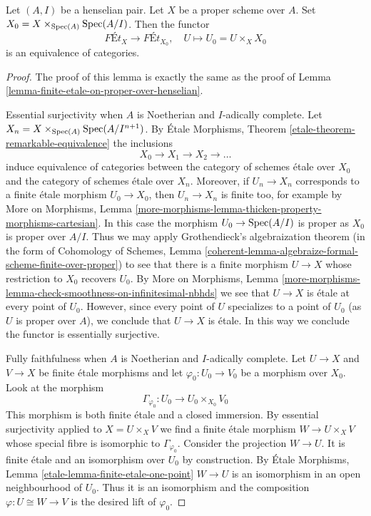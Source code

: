 \begin{lemma}
\label{lemma-finite-etale-on-proper-over-henselian-pair}
Let $(A, I)$ be a henselian pair. Let $X$ be a proper scheme over $A$.
Set $X_0 = X \times_{\mathop{\mathrm{Spec}}(A)} \mathop{\mathrm{Spec}}(A/I)$. Then the functor
$$
\textit{F\'Et}_X \to \textit{F\'Et}_{X_0},\quad
U \longmapsto U_0 = U \times_X X_0
$$
is an equivalence of categories.
\end{lemma}

\begin{proof}
The proof of this lemma is exactly the same as the proof of
Lemma \ref{lemma-finite-etale-on-proper-over-henselian}.

\medskip\noindent
Essential surjectivity when $A$ is Noetherian and $I$-adically complete.
Let $X_n = X \times_{\mathop{\mathrm{Spec}}(A)} \mathop{\mathrm{Spec}}(A/I^{n + 1})$.
By \'Etale Morphisms, Theorem \ref{etale-theorem-remarkable-equivalence}
the inclusions
$$
X_0 \to X_1 \to X_2 \to \ldots
$$
induce equivalence of categories between the category
of schemes \'etale over $X_0$ and the category of schemes
\'etale over $X_n$.
Moreover, if $U_n \to X_n$ corresponds to a finite \'etale
morphism $U_0 \to X_0$, then $U_n \to X_n$ is finite too, for example
by More on Morphisms, Lemma
\ref{more-morphisms-lemma-thicken-property-morphisms-cartesian}.
In this case the morphism $U_0 \to \mathop{\mathrm{Spec}}(A/I)$
is proper as $X_0$ is proper over $A/I$. Thus we may apply
Grothendieck's algebraization theorem
(in the form of
Cohomology of Schemes, Lemma
\ref{coherent-lemma-algebraize-formal-scheme-finite-over-proper})
to see that there is a finite morphism $U \to X$ whose restriction
to $X_0$ recovers $U_0$. By More on Morphisms, Lemma
\ref{more-morphisms-lemma-check-smoothness-on-infinitesimal-nbhds}
we see that $U \to X$ is \'etale at every point of $U_0$.
However, since every point of $U$ specializes to a point of $U_0$
(as $U$ is proper over $A$), we conclude that $U \to X$ is \'etale.
In this way we conclude the functor is essentially surjective.

\medskip\noindent
Fully faithfulness when $A$ is Noetherian and $I$-adically complete.
Let $U \to X$ and $V \to X$ be finite \'etale morphisms and
let $\varphi_0 : U_0 \to V_0$ be a morphism over $X_0$. Look at
the morphism
$$
\Gamma_{\varphi_0} : U_0 \longrightarrow U_0 \times_{X_0} V_0
$$
This morphism is both finite \'etale and a closed immersion.
By essential surjectivity applied to $X = U \times_X V$ we find
a finite \'etale morphism $W \to U \times_X V$ whose special
fibre is isomorphic to $\Gamma_{\varphi_0}$. Consider the projection
$W \to U$. It is finite \'etale and an isomorphism over $U_0$ by
construction. By \'Etale Morphisms, Lemma
\ref{etale-lemma-finite-etale-one-point}
$W \to U$ is an isomorphism in an open neighbourhood of $U_0$.
Thus it is an isomorphism and the composition $\varphi : U \cong W \to V$
is the desired lift of $\varphi_0$.


\end{proof}

